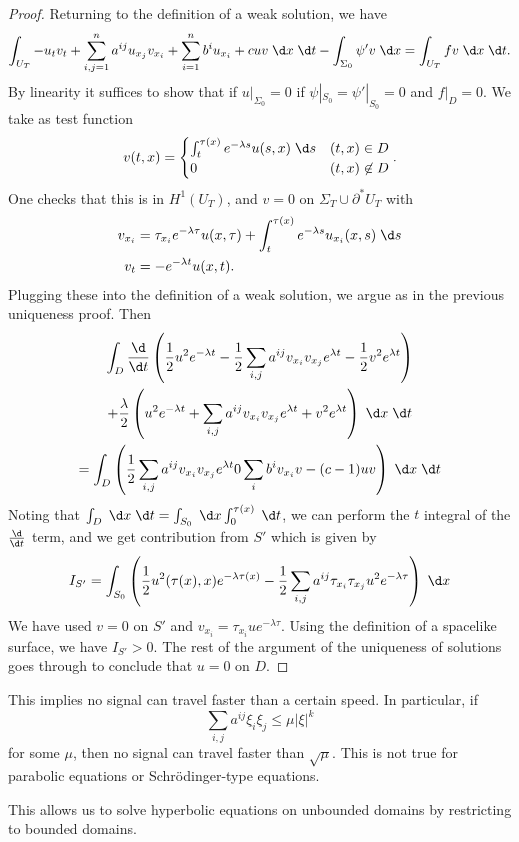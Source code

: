 \documentclass[a4paper]{article}
\begin{document}
\begin{proof}
  Returning to the definition of a weak solution, we have
  \[
    \int_{U_T} - u_t v_t + \sum_{i, j = 1}^{n} a^{ij} u_{x_j} v_{x_i} + \sum_{i = 1}^n b^i u_{x_i} + cuv \;\d x \;\d t - \int_{\Sigma_0} \psi' v \;\d x = \int_{U_T} fv \;\d x\;\d t.
  \]
  By linearity it suffices to show that if $u|_{\Sigma_0} = 0$ if $\psi|_{S_0} = \psi' |_{S_0} = 0$ and $f|_D = 0$. We take as test function
  \[
    v(t, x) =
    \begin{cases}
      \int_t^{\tau(x)} e^{-\lambda s} u(s, x)\;\d s & (t, x) \in D\\
      0 & (t, x) \not \in D
    \end{cases}.
  \]
  One checks that this is in $H^1(U_T)$, and $v = 0$ on $\Sigma_T \cup \partial^* U_T$ with
  \begin{align*}
    v_{x_i} &= \tau_{x_i} e^{-\lambda \tau} u(x, \tau) + \int_t^{\tau(x)} e^{-\lambda s} u_{x_i} (x, s) \;\d s\\
    v_t &= -e^{-\lambda t} u(x, t).
  \end{align*}
  Plugging these into the definition of a weak solution, we argue as in the previous uniqueness proof. Then
  \begin{multline*}
    \int_D \frac{\d}{\d t} \left(\frac{1}{2} u^2 e^{-\lambda t} - \frac{1}{2} \sum_{i, j} a^{ij} v_{x_i} v_{x_j} e^{\lambda t} - \frac{1}{2} v^2 e^{\lambda t}\right)\\
    + \frac{\lambda}{2} \left(u^2 e^{-\lambda t} + \sum_{i, j} a^{ij} v_{x_i} v_{x_j} e^{\lambda t}+ v^2 e^{\lambda t}\right)\;\d x\;\d t\\
    = \int_D \left(\frac{1}{2} \sum_{i, j} a^{ij} v_{x_i} v_{x_j} e^{\lambda t} 0 \sum_i b^i v_{x_i} v - (c - 1) uv\right)\;\d x\;\d t
  \end{multline*}
  Noting that $\int_D \;\d x \;\d t = \int_{S_0} \;\d x \int_0^{\tau(x)}\;\d t$, we can perform the $t$ integral of the $\frac{\d}{\d t}$ term, and we get contribution from $S'$ which is given by
  \[
    I_{S'} =\int_{S_0}\left(\frac{1}{2} u^2 (\tau(x), x) e^{-\lambda \tau(x)} - \frac{1}{2} \sum_{i, j} a^{ij} \tau_{x_i} \tau_{x_j} u^2 e^{-\lambda \tau}\right)\;\d x
  \]
  We have used $v = 0$ on $S'$ and $v_{x_i} = \tau_{x_i} u e^{-\lambda \tau}$. Using the definition of a spacelike surface, we have $I_{S'} > 0$. The rest of the argument of the uniqueness of solutions goes through to conclude that $u = 0$ on $D$.
\end{proof}
This implies no signal can travel faster than a certain speed. In particular, if
\[
  \sum_{i, j} a^{ij} \xi_i \xi_j \leq \mu |\xi|^k
\]
for some $\mu$, then no signal can travel faster than $\sqrt{\mu}$. This is not true for parabolic equations or Schr\"odinger-type equations.

This allows us to solve hyperbolic equations on unbounded domains by restricting to bounded domains.
\printindex
\end{document}
